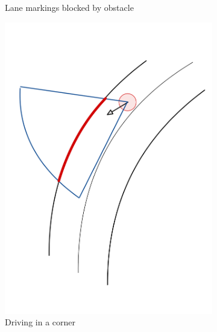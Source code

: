 \begin{figure}
\begin{subfigure}{.24\linewidth}
		\caption{Lane markings blocked by obstacle}
	\end{subfigure}
	\begin{subfigure}{.24\linewidth}
		\includegraphics[width=\textwidth]{Pictures/road detection angle}
		\caption{Driving in a corner}
	\end{subfigure}	
	\begin{subfigure}{.24\linewidth}

\end{subfigure}
\end{figure}
